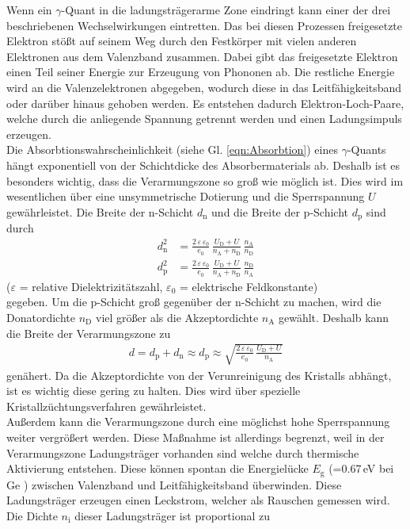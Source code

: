 Wenn ein $\gamma$-Quant in die ladungsträgerarme Zone eindringt kann einer der drei beschriebenen Wechselwirkungen eintretten. Das bei diesen Prozessen freigesetzte Elektron stößt auf seinem Weg durch den Festkörper mit vielen anderen Elektronen aus dem Valenzband zusammen. Dabei gibt das freigesetzte Elektron einen Teil seiner Energie zur Erzeugung von Phononen ab. Die restliche Energie wird an die Valenzelektronen abgegeben, wodurch diese in das Leitfähigkeitsband oder darüber hinaus gehoben werden. Es entstehen dadurch Elektron-Loch-Paare, welche durch die anliegende Spannung getrennt werden und einen Ladungsimpuls erzeugen. \\
Die Absorbtionswahrscheinlichkeit (siehe Gl. \eqref{eqn:Absorbtion}) eines $\gamma$-Quants hängt exponentiell von der Schichtdicke des Absorbermaterials ab. Deshalb ist es besonders wichtig, dass die Verarmungszone so groß wie möglich ist. Dies wird im wesentlichen über eine unsymmetrische Dotierung und die Sperrspannung $U$ gewährleistet. Die Breite der n-Schicht $d_\text{n}$ und die Breite der p-Schicht $d_\text{p}$ sind durch
\begin{align}
	d_\text{n}^2 &= \frac{2\,\varepsilon\,\varepsilon_0} {e_0} \, \frac{U_\text{D} + U}{n_\text{A} + n_\text{D}} \, \frac{n_\text{A}}{n_\text{D}} \\
	d_\text{p}^2 &= \frac{2\,\varepsilon\,\varepsilon_0} {e_0} \, \frac{U_\text{D} + U} {n_\text{A} + n_\text{D}} \, \frac{n_\text{D}}{n_\text{A}}
\end{align}
\hfil {\footnotesize($\varepsilon$ = relative Dielektrizitätszahl, $\varepsilon_0$ = elektrische Feldkonstante)} \hfil \\
gegeben. Um die p-Schicht groß gegenüber der n-Schicht zu machen, wird die Donatordichte $n_\text{D}$ viel größer als die Akzeptordichte $n_\text{A}$ gewählt. Deshalb kann die Breite der Verarmungszone zu
\begin{align}
	d = d_\text{p} + d_\text{n} \approx d_\text{p} \approx \sqrt{\frac{2\,\varepsilon\,\varepsilon_0} {e_0} \, \frac{U_\text{D} + U}{n_\text{A}}}
\end{align}
genähert. Da die Akzeptordichte von der Verunreinigung des Kristalls abhängt, ist es wichtig diese gering zu halten. Dies wird über spezielle Kristallzüchtungsverfahren gewährleistet. \\
Außerdem kann die Verarmungszone durch eine möglichst hohe Sperrspannung weiter vergrößert werden. Diese Maßnahme ist allerdings begrenzt, weil in der Verarmungszone Ladungsträger vorhanden sind welche durch thermische Aktivierung entstehen. Diese können spontan die Energielücke $E_\text{g}$ (=0.67\,eV bei Ge \cite[13]{V18}) zwischen Valenzband und Leitfähigkeitsband überwinden. Diese Ladungsträger erzeugen einen Leckstrom, welcher als Rauschen gemessen wird. Die Dichte $n_\text{i}$ dieser Ladungsträger ist proportional zu
